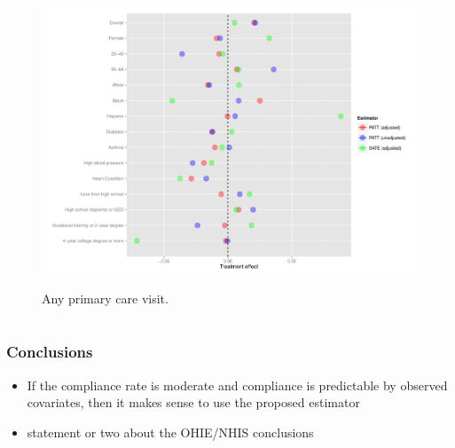 \documentclass{beamer}
\begin{document}
\begin{frame}
\begin{figure}[htbp]
\begin{center}
    \caption{Any primary care visit.}
   \includegraphics[scale=0.35]{../paper/any-out-plot.pdf} 
   \label{het-plot-ao}
   \end{center}
\end{figure}
\end{frame}



\section[Conclusions]{}

\begin{frame}
\frametitle{Conclusions}
\begin{itemize}
\item If the compliance rate is moderate and compliance is predictable by observed covariates, then it makes sense to use the proposed estimator %
\item statement or two about the OHIE/NHIS conclusions
\end{itemize}
\end{frame}

\section[References]{}

\begin{frame}
\begin{singlespace}
\begin{tiny}


\end{tiny}
\end{singlespace}
\itemize
\end{frame}

		
\end{document}
